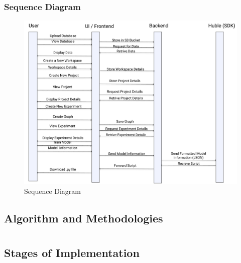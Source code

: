 \documentclass[12pt,a4paper]{report}     %
\begin{document}
\begin{normalsize}
{{{\subsection{Sequence Diagram}
\begin{figure}[H]
    \centering
    \includegraphics[scale=0.6]{diagrams/Sequence_diagram.png}
        \caption{Sequence Diagram}
    \label{}
\end{figure}

\section{Algorithm and Methodologies}

}


\newpage 
\chapter{}
{\setlength{\baselineskip}{1.1\baselineskip}
\section{Stages of Implementation}

}}}
\end{normalsize}
\end{document}
